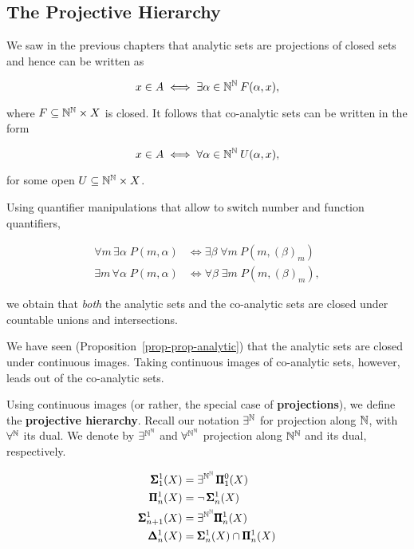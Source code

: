 \subsection{The Projective Hierarchy}

We saw in the previous chapters that analytic sets are projections of closed sets and hence can be written as

\begin{equation}
x \in A \iff \exists \alpha \in \mathbb{N}^{\mathbb{N}} \: F(\alpha,x),
\end{equation}

where $F \subseteq \mathbb{N}^{\mathbb{N}} \times X$ is closed. It follows that co-analytic sets can be written in the form

\begin{equation*}
x \in A \iff \forall \alpha \in \mathbb{N}^{\mathbb{N}} \: U(\alpha,x),
\end{equation*}

for some open $U \subseteq \mathbb{N}^{\mathbb{N}} \times X$.

Using quantifier manipulations that allow to switch number and function quantifiers,

\begin{align*}
	\forall m  \, \exists \alpha \; P(m,\alpha)  & \iff   \exists \beta  \; \forall m \:  P(m,(\beta)_m)\\
	\exists m   \, \forall \alpha \; P(m,\alpha) &\iff \forall \beta  \; \exists m  \;   P(m,(\beta)_m),
\end{align*}

we obtain that \textit{both} the analytic sets and the co-analytic sets are closed under countable unions and intersections.

We have seen (Proposition~\ref{prop-prop-analytic}) that the analytic sets are closed under continuous images. Taking continuous images of co-analytic sets, however, leads out of the co-analytic sets.

Using continuous images (or rather, the special case of \textbf{projections}), we define the \textbf{projective hierarchy}. Recall our notation $\exists^{\mathbb{N}}$ for projection along $\mathbb{N}$, with $\forall^{\mathbb{N}}$ its dual. We denote by $\exists^{\mathbb{N}^{\mathbb{N}}}$ and $\forall^{\mathbb{N}^{\mathbb{N}}}$ projection along $\mathbb{N}^{\mathbb{N}}$ and its dual, respectively.

\begin{align*}
 \pmb{\Sigma}^{1}_{1}(X) &= \exists^{\mathbb{N}^{\mathbb{N}}} \, \pmb{\Pi}^0_{1}(X) \\
 \pmb{\Pi}^1_{n}(X) &= \neg \, \pmb{\Sigma}^{1}_{n}(X)  \\
 \pmb{\Sigma}^{1}_{n+1}(X) &= \exists^{\mathbb{N}^{\mathbb{N}}} \pmb{\Pi}^1_{n}(X) \\
 \pmb{\Delta}^1_n(X) &= \pmb{\Sigma}^{1}_{n}(X) \cap \pmb{\Pi}^1_{n}(X) \\
\end{align*}

